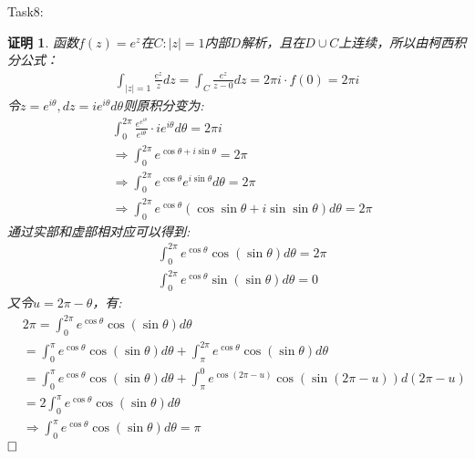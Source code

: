 \documentclass{ctexart}
\newcommand{\。}{．} %
\newenvironment{lanse}{
    \begin{tcolorbox}[breakable,enhanced, colback=qlan, boxrule=0pt, frame hidden,
        borderline west={0.7mm}{0.1mm}{slan}]
    }
    {\end{tcolorbox}}
\theoremstyle{t} %
\newtheorem*{zmhj}{\color{slan} 证明}
\newenvironment{zm}{\begin{lanse}\begin{zmhj}}{$\hfill \square$\end{zmhj}\end{lanse}}
\begin{document}
Task8:
\begin{zm}
    函数$f(z)=e^z$在$C:|z|=1$内部$D$解析，且在$D\cup C$上连续，所以由柯西积分公式：
    \begin{align*}
        \int_{|z|=1}\frac{e^z}{z}dz=\int_{C}\frac{e^z}{z-0}dz=2\pi i\cdot f(0)=2\pi i
    \end{align*}
    令$z=e^{i\theta},dz=ie^{i\theta}d\theta$则原积分变为:
    \begin{align*}
        &\int_{0}^{2\pi}\frac{e^{e^{i\theta}}}{e^{i\theta}}\cdot ie^{i\theta}d\theta=2\pi i\\
        &\Rightarrow \int_{0}^{2\pi}e^{\cos \theta+i\sin\theta}=2\pi\\
        &\Rightarrow \int_{0}^{2\pi}e^{\cos \theta}e^{i\sin\theta}d\theta=2\pi\\
        &\Rightarrow \int_{0}^{2\pi}e^{\cos\theta}\left(\cos\sin\theta+i\sin\sin\theta\right)d\theta=2\pi
    \end{align*}
    通过实部和虚部相对应可以得到:
    \begin{align*}
        &\int_{0}^{2\pi}e^{\cos \theta}\cos(\sin\theta)d\theta=2\pi\\
        &\int_{0}^{2\pi}e^{\cos \theta}\sin(\sin\theta)d\theta=0
    \end{align*}
    又令$u=2\pi-\theta$，有:
    \begin{align*}
        &2\pi=\int_{0}^{2\pi}e^{\cos \theta}\cos(\sin\theta)d\theta\\
        &=\int_{0}^{\pi}e^{\cos \theta}\cos(\sin\theta)d\theta+\int_{\pi}^{2\pi}e^{\cos \theta}\cos(\sin\theta)d\theta\\
        &=\int_{0}^{\pi}e^{\cos \theta}\cos(\sin\theta)d\theta+\int_{\pi}^{0}e^{\cos (2\pi-u)}\cos(\sin(2\pi-u))d(2\pi-u)\\
        &=2\int_{0}^{\pi}e^{\cos \theta}\cos(\sin\theta)d\theta\\
        &\Rightarrow \int_{0}^{\pi}e^{\cos \theta}\cos(\sin\theta)d\theta=\pi
    \end{align*}
\end{zm}
\end{document}
